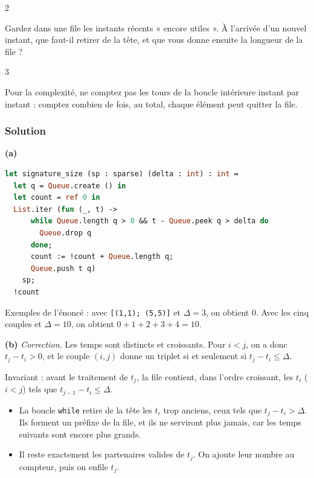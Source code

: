 \documentclass[11pt,a4paper]{article}
\providecommand{\tightlist}{\setlength{\itemsep}{0pt}\setlength{\parskip}{0pt}}
\begin{document}
\begin{indication}{2}

Gardez dans une file les instants récents « encore utiles ». À l'arrivée d'un nouvel instant, que faut-il retirer de la tête, et que vous donne ensuite la longueur de la file ?

\end{indication}

\begin{indication}{3}

Pour la complexité, ne comptez pas les tours de la boucle intérieure instant par instant : comptez combien de fois, au total, chaque élément peut quitter la file.

\end{indication}

\hypertarget{solution-7}{%
\subsubsection{Solution}\label{solution-7}}

\textbf{(a)}

\begin{lstlisting}[language=Caml]
let signature_size (sp : sparse) (delta : int) : int =
  let q = Queue.create () in
  let count = ref 0 in
  List.iter (fun (_, t) ->
      while Queue.length q > 0 && t - Queue.peek q > delta do
        Queue.drop q
      done;
      count := !count + Queue.length q;
      Queue.push t q)
    sp;
  !count
\end{lstlisting}

Exemples de l'énoncé : avec \texttt{{[}(1,1);\ (5,5){]}} et \(\Delta=3\), on obtient 0. Avec les cinq couples et \(\Delta=10\), on obtient \(0+1+2+3+4=10\).

\textbf{(b)} \emph{Correction.} Les temps sont distincts et croissants. Pour \(i<j\), on a donc \(t_j-t_i>0\), et le couple \((i,j)\) donne un triplet si et seulement si \(t_j-t_i\le\Delta\).

Invariant : avant le traitement de \(t_j\), la file contient, dans l'ordre croissant, les \(t_i\) (\(i<j\)) tels que \(t_{j-1}-t_i\le\Delta\).

\begin{itemize}
\tightlist
\item
  La boucle \texttt{while} retire de la tête les \(t_i\) trop anciens, ceux tels que \(t_j-t_i>\Delta\). Ils forment un préfixe de la file, et ils ne serviront plus jamais, car les temps suivants sont encore plus grands.
\item
  Il reste exactement les partenaires valides de \(t_j\). On ajoute leur nombre au compteur, puis on enfile \(t_j\).
\end{itemize}
\end{document}
